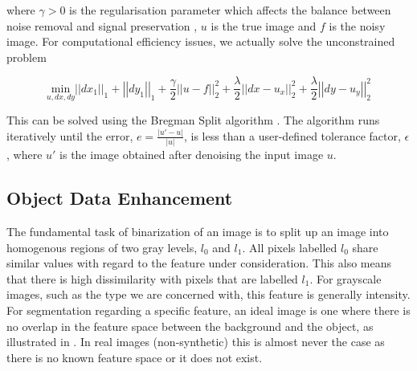 \begin{definition}
	where $\gamma > 0$ is the regularisation parameter which affects the balance between noise removal and signal preservation \citep{Getreuer2012}, $u$ is the true image and $f$ is the noisy image. For computational efficiency issues, we actually solve the unconstrained problem
	
	\begin{equation}
	\underset{u, dx, dy} {\mathrm{min}} \left| \left|dx_1 \right| \right|_1 + \left| \left| dy_1 \right| \right|_1 + \frac{\gamma}{2} \left| \left| u-f \right| \right|^2_2 +
	\frac{\lambda}{2} \left| \left| dx-u_x \right| \right|^2_2 + \frac{\lambda}{2} \left| \left| dy-u_y \right| \right|^2_2
	\label{equ:anisotropic_tv_unconstrained}
	\end{equation}
	
	This can be solved using the Bregman Split algorithm \citep{Wei2010}.
	The algorithm runs iteratively until the error, $e = \frac{\vert u'-u \vert}{\vert u \vert}$,  is less than a user-defined tolerance factor, $\epsilon$, where $u'$ is the image obtained after denoising the input image $u$. 
\end{definition}

\subsection{Object Data Enhancement}
\label{sec:contrastcorrection}

The fundamental task of binarization of an image is to split up an image into homogenous regions of two gray levels, $l_0$ and $l_1$. All pixels labelled $l_0$ share similar values with regard to the feature under consideration. This also means that there is high dissimilarity with pixels that are labelled $l_1$.
For grayscale images, such as the type we are concerned with, this feature is generally intensity.
For segmentation regarding a specific feature, an ideal image is one where there is no overlap in the feature space between the background and the object, as illustrated in . In real images (non-synthetic) this is almost never the case as there is no known feature space or it does not exist.

